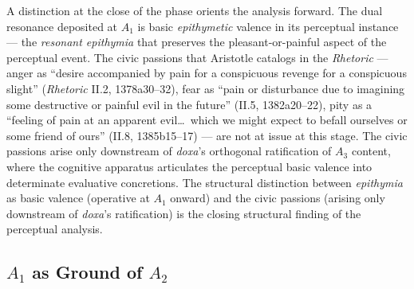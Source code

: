 \documentclass{article}
\begin{document}
A distinction at the close of the phase orients the analysis forward. The dual resonance deposited at $A_1$ is basic \textit{epithymetic} valence in its perceptual instance --- the \textit{resonant epithymia} that preserves the pleasant-or-painful aspect of the perceptual event. The civic passions that Aristotle catalogs in the \textit{Rhetoric} --- anger as ``desire accompanied by pain for a conspicuous revenge for a conspicuous slight'' (\textit{Rhetoric} II.2, 1378a30--32), fear as ``pain or disturbance due to imagining some destructive or painful evil in the future'' (II.5, 1382a20--22), pity as a ``feeling of pain at an apparent evil\ldots\ which we might expect to befall ourselves or some friend of ours'' (II.8, 1385b15--17) --- are not at issue at this stage. The civic passions arise only downstream of \textit{doxa}'s orthogonal ratification of $A_3$ content, where the cognitive apparatus articulates the perceptual basic valence into determinate evaluative concretions. The structural distinction between \textit{epithymia} as basic valence (operative at $A_1$ onward) and the civic passions (arising only downstream of \textit{doxa}'s ratification) is the closing structural finding of the perceptual analysis.

\subsection{$A_1$ as Ground of $A_2$}
\end{document}
